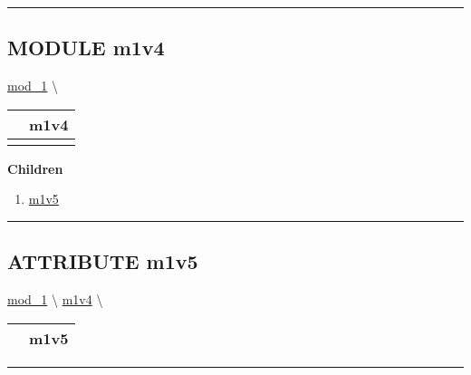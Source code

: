 \par


\rule{\linewidth}{0.5pt}
\subsection*{\textsf{\colorbox{headtoc}{\color{white} MODULE}
m1v4}}

\hypertarget{ecldoc:mod_1.m1v4}{}
\hspace{0pt} \hyperlink{ecldoc:mod_1}{mod_1} \textbackslash 

{\renewcommand{\arraystretch}{1.5}
\begin{tabularx}{\textwidth}{|>{\raggedright\arraybackslash}l|X|}
\hline
\hspace{0pt}\mytexttt{\color{red} } & \textbf{m1v4} \\
\hline
\multicolumn{2}{|>{\raggedright\arraybackslash}X|}{\hspace{0pt}\mytexttt{\color{param} (REAL8 a1)}} \\
\hline
\end{tabularx}
}

\par


\textbf{Children}
\begin{enumerate}
\item \hyperlink{ecldoc:mod_1.m1v4.m1v5}{m1v5}
\end{enumerate}

\rule{\linewidth}{0.5pt}

\subsection*{\textsf{\colorbox{headtoc}{\color{white} ATTRIBUTE}
m1v5}}

\hypertarget{ecldoc:mod_1.m1v4.m1v5}{}
\hspace{0pt} \hyperlink{ecldoc:mod_1}{mod_1} \textbackslash 
\hspace{0pt} \hyperlink{ecldoc:mod_1.m1v4}{m1v4} \textbackslash 

{\renewcommand{\arraystretch}{1.5}
\begin{tabularx}{\textwidth}{|>{\raggedright\arraybackslash}l|X|}
\hline
\hspace{0pt}\mytexttt{\color{red} } & \textbf{m1v5} \\
\hline
\end{tabularx}
}

\par


\rule{\linewidth}{0.5pt}


